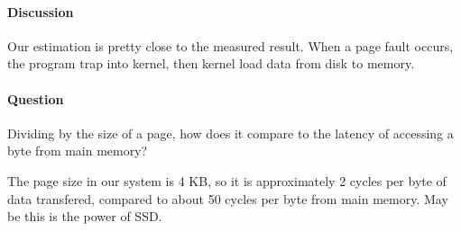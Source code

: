 \paragraph{Discussion}
Our estimation is pretty close to the measured result. When a page fault occurs, the program trap into kernel, then kernel load data from disk to memory. 

\paragraph{Question} Dividing by the size of a page, how does it compare to the latency of accessing a byte from main memory?

The page size in our system is 4 KB, so it is approximately 2 cycles per byte of data transfered, compared to about 50 cycles per byte from main memory. May be this is the power of SSD.
